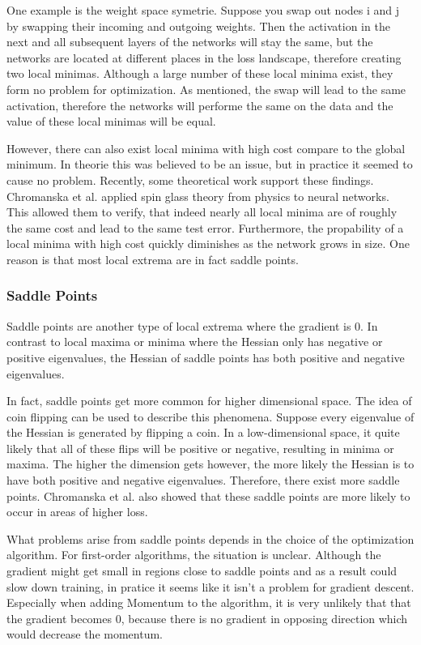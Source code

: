One example is the weight space symetrie. Suppose you swap out nodes i and j by
swapping their incoming and outgoing weights. Then the activation in the next
and all subsequent layers of the networks will stay the same, but the networks
are located at different places in the loss landscape, therefore creating two
local minimas. Although a large number of these local minima exist, they form no
problem for optimization. As mentioned, the swap will lead to the same
activation, therefore the networks will performe the same on the data and the
value of these local minimas will be equal.

However, there can also exist local minima with high cost compare to the global
minimum. In theorie this was believed to be an issue, but in practice it seemed
to cause no problem. Recently, some theoretical work support these findings.
Chromanska et al. \cite{choromanska2015loss} applied spin glass theory from
physics to neural networks. This allowed them to verify, that indeed nearly all
local minima are of roughly the same cost and lead to the same test error.
Furthermore, the propability of a local minima with high cost quickly diminishes
as the network grows in size. One reason is that most local extrema are in fact
saddle points.

\subsubsection{Saddle Points}\label{prob:3}
Saddle points are another type of local extrema where the gradient is 0. In
contrast to local maxima or minima where the Hessian only has negative or
positive eigenvalues, the Hessian of saddle points has both positive and
negative eigenvalues.

In fact, saddle points get more common for higher dimensional space. The idea of
coin flipping can be used to describe this phenomena. Suppose every eigenvalue
of the Hessian is generated by flipping a coin. In a low-dimensional space, it
quite likely that all of these flips will be positive or negative, resulting in
minima or maxima. The higher the dimension gets however, the more likely the
Hessian is to have both positive and negative eigenvalues. Therefore, there
exist more saddle points. Chromanska et al. \cite{choromanska2015loss} also
showed that these saddle points are more likely to occur in areas of higher
loss.

What problems arise from saddle points depends in the choice of the optimization
algorithm. For first-order algorithms, the situation is unclear. Although the
gradient might get small in regions close to saddle points and as a result could
slow down training, in pratice it seems like it isn't a problem for gradient
descent. Especially when adding Momentum to the algorithm, it is very unlikely
that that the gradient becomes 0, because there is no gradient in opposing
direction which would decrease the momentum.

